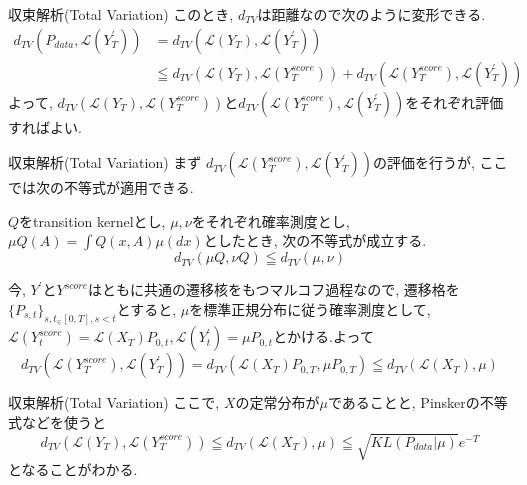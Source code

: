 \documentclass[dvipdfmx,11pt]{beamer}
\theoremstyle{plain}
\theoremstyle{定義}
\begin{document}
  \begin{frame}{収束解析(Total Variation)}
    このとき, $d_{TV}$は距離なので次のように変形できる.
    \begin{align*}
      d_{TV}(P_{data},\mathcal{L}(Y^{\prime}_T))&=d_{TV}(\mathcal{L}(Y_T),\mathcal{L}(Y^{\prime}_T))\\
      &\leqq d_{TV}(\mathcal{L}(Y_T),\mathcal{L}(Y^{score}_T))+d_{TV}(\mathcal{L}(Y^{score}_T),\mathcal{L}(Y^{\prime}_T))
    \end{align*}
    よって, $d_{TV}(\mathcal{L}(Y_T),\mathcal{L}(Y^{score}_T))$と$d_{TV}(\mathcal{L}(Y^{score}_T),\mathcal{L}(Y^{\prime}_T))$をそれぞれ評価すればよい.
  \end{frame}
  \begin{frame}{収束解析(Total Variation)}
    まず $d_{TV}(\mathcal{L}(Y^{score}_T),\mathcal{L}(Y^{\prime}_T))$の評価を行うが, ここでは次の不等式が適用できる.
    \begin{theorem}[データ処理不等式]
      $Q$をtransition kernelとし, $\mu, \nu$をそれぞれ確率測度とし, $\mu Q(A)=\int Q(x,A)\mu(dx)$としたとき, 次の不等式が成立する.
      \begin{equation*}
        d_{TV}(\mu Q,\nu Q)\leqq d_{TV}(\mu,\nu)
      \end{equation*}
    \end{theorem}
    今, $Y^{\prime}$と$Y^{score}$はともに共通の遷移核をもつマルコフ過程なので, 遷移格を$\{P_{s,t}\}_{s,t_\in [0,T], s<t}$とすると, 
    $\mu$を標準正規分布に従う確率測度として, $\mathcal{L}(Y^{score}_t)=\mathcal{L}(X_T) P_{0,t}, \mathcal{L}(Y^{\prime}_t)=\mu  P_{0,t}$とかける.よって
    \begin{equation*}
      d_{TV}(\mathcal{L}(Y^{score}_T),\mathcal{L}(Y^{\prime}_T))=d_{TV}(\mathcal{L}(X_T)  P_{0,T},\mu  P_{0,T})\leqq d_{TV}(\mathcal{L}(X_T),\mu)
    \end{equation*}
  \end{frame}
  \begin{frame}{収束解析(Total Variation)}
    ここで, $X$の定常分布が$\mu$であることと, Pinskerの不等式などを使うと
    \begin{equation*}
      d_{TV}(\mathcal{L}(Y_T),\mathcal{L}(Y^{score}_T))\leqq  d_{TV}(\mathcal{L}(X_T),\mu)\leqq \sqrt{KL(P_{data}|\mu)}e^{-T}
    \end{equation*}
    となることがわかる.\cite{D_Bakry}
  \end{frame}
\end{document}
